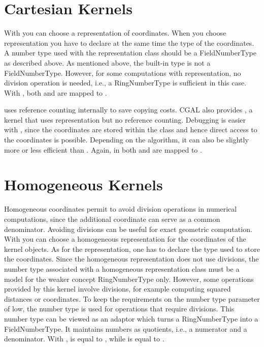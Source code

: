 \section{Cartesian Kernels}
With  you can choose a
 representation of coordinates. When you
choose  representation you have to
declare at the same time the type of the coordinates.  A number type
used with the  representation class should be a
FieldNumberType as described above. As mentioned above, the built-in
type  is not a FieldNumberType. However, for some
computations with  representation, no
division operation is needed, i.e., a RingNumberType is sufficient in
this case. With , both
 and
 are mapped to
.

 uses reference counting internally to
save copying costs. CGAL also provides
, a kernel that uses
 representation but no reference
counting.  Debugging is easier with
, since the coordinates are
stored within the class and hence direct access to the coordinates is
possible.  Depending on the algorithm, it can also be slightly more or
less efficient than . Again, in
 both
 and
 are mapped to
.

\section{Homogeneous Kernels}
Homogeneous coordinates permit to avoid division operations in
numerical computations, since the additional coordinate can serve as a
common denominator.  Avoiding divisions can be useful for exact
geometric computation.  With  you can
choose a homogeneous representation for the coordinates of the kernel
objects. As for the  representation, one
has to declare the type used to store the coordinates. Since the
homogeneous representation does not use divisions, the number type
associated with a homogeneous representation class must be a model for
the weaker concept RingNumberType only. However, some operations
provided by this kernel involve divisions, for example computing
squared distances or  coordinates. To
keep the requirements on the number type parameter of
 low, the number type
 is used for operations that require
divisions. This number type can be viewed as an adaptor which turns a
RingNumberType into a FieldNumberType. It maintains numbers as
quotients, i.e., a numerator and a denominator. With
,
 is equal to
, while
 is equal to
.

